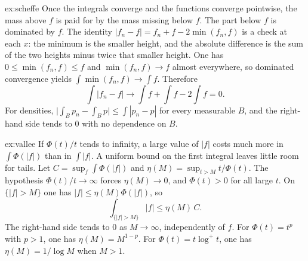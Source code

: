 \begin{solution}{ex:scheffe}
\idea Once the integrals converge and the functions converge pointwise, the mass above \(f\) is paid for by the mass missing below \(f\). The part below \(f\) is dominated by \(f\).
\writeup The identity \(|f_n-f|=f_n+f-2\min(f_n,f)\) is a check at each \(x\): the minimum is the smaller height, and the absolute difference is the sum of the two heights minus twice that smaller height. One has \(0\le\min(f_n,f)\le f\) and \(\min(f_n,f)\to f\) almost everywhere, so dominated convergence yields \(\int\min(f_n,f)\to\int f\). Therefore
\[
\int|f_n-f|\to\int f+\int f-2\int f=0.
\]
For densities, \(\bigl|\int_Bp_n-\int_Bp\bigr|\le\int|p_n-p|\) for every measurable \(B\), and the right-hand side tends to \(0\) with no dependence on \(B\).
\end{solution}

\begin{solution}{ex:vallee}
\idea If \(\Phi(t)/t\) tends to infinity, a large value of \(|f|\) costs much more in \(\int\Phi(|f|)\) than in \(\int|f|\). A uniform bound on the first integral leaves little room for tails.
\writeup Let \(C=\sup_f\int\Phi(|f|)\) and \(\eta(M)=\sup_{t>M}t/\Phi(t)\). The hypothesis \(\Phi(t)/t\to\infty\) forces \(\eta(M)\to0\), and \(\Phi(t)>0\) for all large \(t\). On \(\{|f|>M\}\) one has \(|f|\le\eta(M)\Phi(|f|)\), so
\[
\int_{\{|f|>M\}}|f|\le\eta(M)\,C.
\]
The right-hand side tends to \(0\) as \(M\to\infty\), independently of \(f\). For \(\Phi(t)=t^p\) with \(p>1\), one has \(\eta(M)=M^{1-p}\). For \(\Phi(t)=t\log^+t\), one has \(\eta(M)=1/\log M\) when \(M>1\).
\end{solution}

